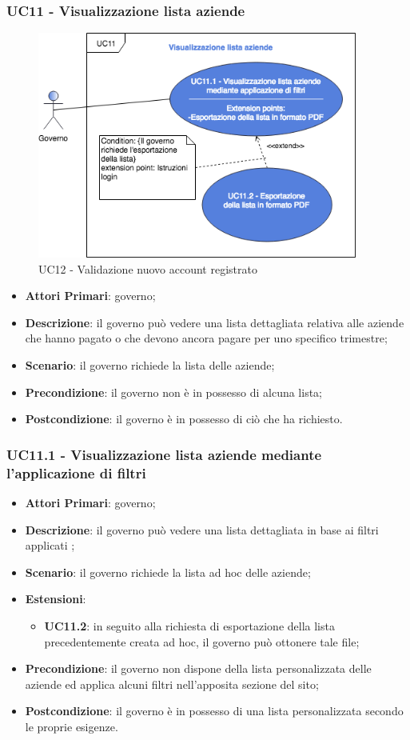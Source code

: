 \subsubsection{UC11 - Visualizzazione lista aziende}
\begin{figure}[h]
	\includegraphics[width=10.5cm]{res/images/UC11Visualizzazione.png} %
	\centering
	\caption{UC12 - Validazione nuovo account registrato}
	
\end{figure}
\begin{itemize}
	\item \textbf{Attori Primari}: governo;
	\item \textbf{Descrizione}: il governo può vedere una lista dettagliata relativa alle aziende che hanno pagato o che devono ancora pagare per uno specifico trimestre;
	\item \textbf{Scenario}: il governo richiede la lista delle aziende;
	\item \textbf{Precondizione}: il governo non è in possesso di alcuna lista;
	\item \textbf{Postcondizione}: il governo è in possesso di ciò che ha richiesto.
\end{itemize}
\subsubsection{UC11.1 - Visualizzazione lista aziende mediante l'applicazione di filtri}
\begin{itemize}
	\item \textbf{Attori Primari}: governo;
	\item \textbf{Descrizione}: il governo può vedere una lista dettagliata in base ai filtri applicati ;
	\item \textbf{Scenario}: il governo richiede la lista ad hoc delle aziende;
		\item \textbf{Estensioni}:
	\begin{itemize}
		\item \textbf{UC11.2}: in seguito alla richiesta di esportazione della lista precedentemente creata ad hoc, il governo può ottonere tale file;
	\end{itemize}
	\item \textbf{Precondizione}: il governo non dispone della lista personalizzata delle aziende ed applica alcuni filtri nell'apposita sezione del sito;
	\item \textbf{Postcondizione}: il governo è in possesso di una lista personalizzata secondo le proprie esigenze.
\end{itemize}
